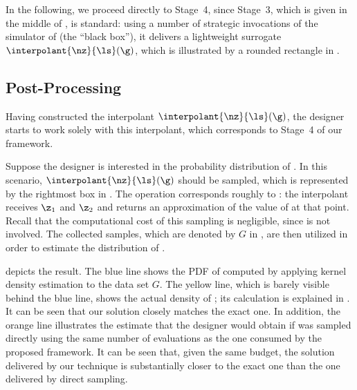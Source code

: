 In the following, we proceed directly to Stage~4, since Stage~3, which is given
in the middle of , is standard: using a number of
strategic invocations of the simulator of \g (the ``black box''), it delivers a
lightweight surrogate $\interpolant{\nz}{\ls}(\g)$, which is illustrated by a
rounded rectangle in .

\subsection{Post-Processing}

Having constructed the interpolant $\interpolant{\nz}{\ls}(\g)$, the designer
starts to work solely with this interpolant, which corresponds to Stage~4 of our
framework.

Suppose the designer is interested in the probability distribution of \g. In
this scenario, $\interpolant{\nz}{\ls}(\g)$ should be sampled, which is
represented by the rightmost box in . The operation
corresponds roughly to : the interpolant receives $\z_1$
and $\z_2$ and returns an approximation of the value of \g at that point. Recall
that the computational cost of this sampling is negligible, since \g is not
involved. The collected samples, which are denoted by $G$ in
, are then utilized in order to estimate the
distribution of \g.

 depicts the result. The blue line shows the \ac{PDF} of \g
computed by applying kernel density estimation \cite{hastie2013} to the data set
$G$. The yellow line, which is barely visible behind the blue line, shows the
actual density of \g; its calculation is explained in . It
can be seen that our solution closely matches the exact one. In addition, the
orange line illustrates the estimate that the designer would obtain if \g was
sampled directly using the same number of evaluations as the one consumed by the
proposed framework. It can be seen that, given the same budget, the solution
delivered by our technique is substantially closer to the exact one than the one
delivered by direct sampling.
